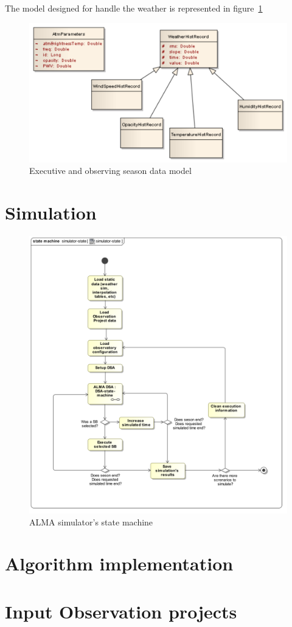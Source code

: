 The model designed for handle the weather is represented in figure~\ref{fig:datamodel-weather}

\begin{figure}[]	
\begin{center}
\includegraphics[width=\textwidth]{images/Weather}
\caption{Executive and observing season data model}
\end{center}
\label{fig:datamodel-weather}
\end{figure}

\section {Simulation}

\begin{figure}[]	
\begin{center}
\includegraphics[width=\textwidth]{images/simulator-state-machine}
\caption{ALMA simulator's state machine}
\end{center}
\label{fig:sim-state-machine}
\end{figure}

\section {Algorithm implementation}

\section {Input Observation projects}